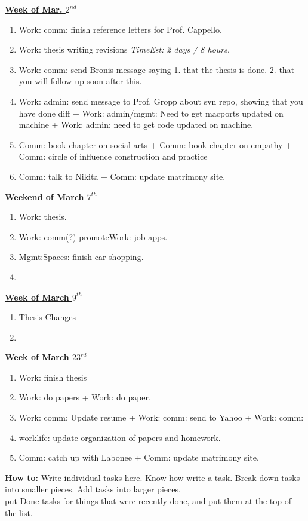 \documentclass[11pt]{article}
\newcommand{\te}[1]{\textit{TimeEst:} \textit{#1}}
\begin{document}
{\small \underline{\textbf{Week of Mar. $2^{nd}$}} }\\
\begin{enumerate} 
\item \small Work: comm: finish reference letters for Prof. Cappello.  
\item \small Work: thesis writing revisions \te {2 days / 8
  hours}. 
\item \small Work: comm: send Bronis message saying
  1. that the thesis is done.  2. that you will follow-up
  soon after this.
\item \small Work: admin: send message to Prof. Gropp about
  svn repo, showing that you have done diff   + Work:
  admin/mgmt: Need to get macports updated on machine +
  Work: admin: need to get code updated on machine. 
\item \small Comm: book chapter on social arts + Comm: book
  chapter on empathy + Comm: circle of influence construction and
  practice 
\item \small Comm: talk to Nikita + Comm: update matrimony site. 
\end{enumerate}

{\small \underline{\textbf{Weekend of March $7^{th}$}}}\\
\begin{enumerate} 
  \small \item \small Work: thesis. 
\item \small Work: comm(?)-promoteWork: job apps. 
\item \small Mgmt:Spaces: finish car shopping.
\item \small 
\end{enumerate} 

{\small \underline{\textbf{Week of March $9^{th}$}}}\\  
\begin{enumerate} 
  \small \item \small Thesis Changes  
\item \small 
\end{enumerate} 

{\small \underline{\textbf{Week of March $23^{rd}$}}}\\  
\begin{enumerate} 
  \small \item \small Work: finish thesis 
  \small \item \small Work: do papers + Work: do paper. 
  \small \item \small Work: comm: Update resume  + Work: comm: send to
  Yahoo + Work: comm: 
\item \small worklife: update organization of papers and homework. 
\item \small Comm: catch up with Labonee + Comm: update matrimony
  site. 
\end{enumerate} 
\newpage 
\textbf{How to:} Write individual tasks here. Know how write a task. 
Break down tasks into smaller pieces. Add tasks into larger
pieces. \\ put Done tasks for things that were recently done, and put
them at the top of the list.
\end{document}

